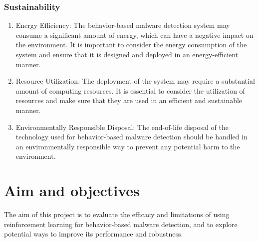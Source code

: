 \documentclass[12pt,a4paper,twoside]{article}
\begin{document}
\subsubsection{Sustainability}\label{sec:Sustainability}
    \begin{enumerate}

        \item Energy Efficiency: The behavior-based malware detection system may consume a significant amount of energy, which can have a negative impact on the environment. It is important to consider the energy consumption of the system and ensure that it is designed and deployed in an energy-efficient manner.

        \item  Resource Utilization: The deployment of the system may require a substantial amount of computing resources. It is essential to consider the utilization of resources and make sure that they are used in an efficient and sustainable manner.

        \item Environmentally Responsible Disposal: The end-of-life disposal of the technology used for behavior-based malware detection should be handled in an environmentally responsible way to prevent any potential harm to the environment.
    \end{enumerate}


\section{Aim and objectives}
\label{sec:aim}

The aim of this project is to evaluate the efficacy and limitations of using reinforcement learning for behavior-based malware detection, and to explore potential ways to improve its performance and robustness.
\end{document}
